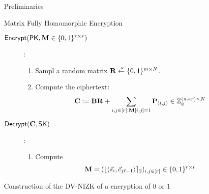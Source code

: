 \begin{section}{Preliminaries}
\begin{subsection}{Matrix Fully Homomorphic Encryption~\cite{DBLP:conf/pkc/HiromasaAO15}}
\begin{description}
    \item[${\mathsf{Encrypt}}(\mathsf{PK}, \mathbf{M} \in \{0,1\}^{r \times r})$] :
      \begin{enumerate}
      \item Sampl a random matrix $\mathbf{R} \stackrel{{\scriptscriptstyle \mkern4mu R}}{\gets} \{0,1\}^{m \times N}$.
      \item Compute the ciphertext:
        \begin{align*}
          \mathbf{C} &:= \mathbf{B} \mathbf{R} + \sum_{i,j \in [r] : \mathbf{M}[i,j] = 1} \mathbf{P}_{(i,j)} \in \mathbb{Z}_q^{(n+r) \times N}
        \end{align*}
      \end{enumerate}

    \item[${\mathsf{Decrypt}}(\mathbf{C}, \mathsf{SK})$]:
      \begin{enumerate}
      \item Compute
        \begin{align*}
          \mathbf{M} &=(\lfloor\langle \vec{s}_i, \vec{c}_{j\ell-1} \rangle\rceil_2)_{i,j \in [r]} \in \{0,1\}^{r \times r}
        \end{align*}
      \end{enumerate}
    \end{description}
  \end{subsection}
  
  
  \begin{subsection}{Construction of the DV-NIZK of a encryption of $0$ or $1$}
    \begin{description}
      

\end{description}
\end{subsection}
\end{section}
